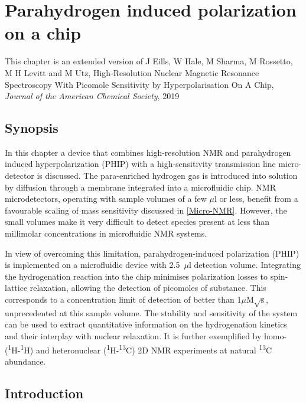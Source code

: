 
\chapter{Parahydrogen induced polarization on a chip} \label{Chapter:Parahydrogen}

 This chapter is an extended version of J Eills\footnotemark, W Hale\footnotemark[\value{footnote}], M Sharma,
 M Rossetto, M H Levitt and M Utz, High-Resolution Nuclear Magnetic Resonance
 Spectroscopy With Picomole Sensitivity by Hyperpolarisation On A Chip,
 \textit{Journal of the American Chemical Society}, 2019 \citep{Hale2019PHIP}
\section{Synopsis}
In this chapter a device that combines high-resolution NMR and parahydrogen induced hyperpolarization (PHIP)
with a high-sensitivity transmission line micro-detector is discussed.
The para-enriched hydrogen gas is introduced into solution by diffusion
through a membrane integrated into a microfluidic chip.
NMR microdetectors, operating with sample volumes of a few $\mu$l or less,
benefit from a favourable scaling of mass sensitivity discussed
in \ref{Micro-NMR}. However, the small volumes make it very difficult to
detect species present at less
than millimolar concentrations in microfluidic NMR systems.

In view of
overcoming this limitation, parahydrogen-induced polarization
(PHIP) is implemented on a microfluidic device with 2.5~$\mu$l detection volume.
Integrating the hydrogenation reaction into the chip minimises polarization
losses to spin-lattice relaxation, allowing the detection of picomoles of
substance. This corresponds to a concentration limit of detection of better than
1$\mu$M$\sqrt{\text{s}}$, unprecedented at this sample volume.  The
stability and sensitivity of the  system can be used to extract
quantitative information on the hydrogenation kinetics and
their interplay with nuclear relaxation. It is further exemplified by homo-
(\textsuperscript{1}H-\textsuperscript{1}H) and heteronuclear
(\textsuperscript{1}H-\textsuperscript{13}C) 2D NMR experiments
 at natural \textsuperscript{13}C abundance.

 \section{Introduction}

